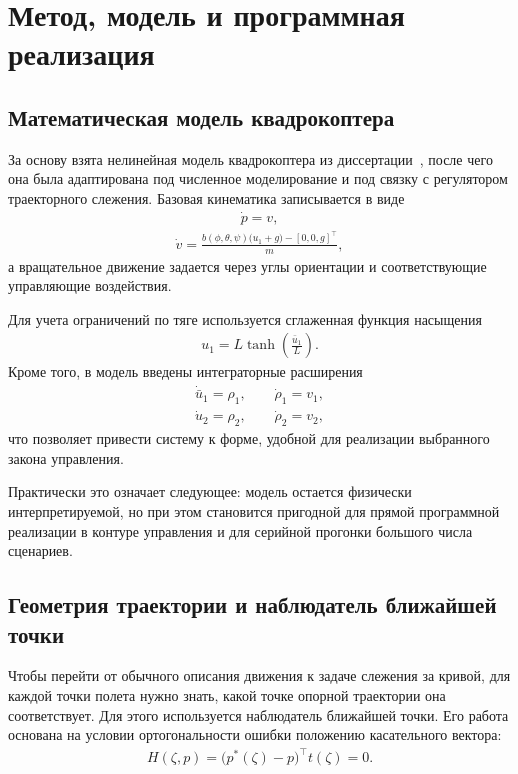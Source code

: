 \chapter{Метод, модель и программная реализация}

\section{Математическая модель квадрокоптера}

За основу взята нелинейная модель квадрокоптера из диссертации~\cite{kim_algorithms}, после чего она была адаптирована под численное моделирование и под связку с регулятором траекторного слежения. Базовая кинематика записывается в виде
\begin{gather}
    \dot{p} = v,
\end{gather}
\begin{gather}
    \dot{v} = \frac{b(\phi,\theta,\psi)\bigl(u_1 + g\bigr) - [0,0,g]^{\top}}{m},
\end{gather}
а вращательное движение задается через углы ориентации и соответствующие управляющие воздействия.

Для учета ограничений по тяге используется сглаженная функция насыщения
\begin{gather}
    u_1 = L \tanh\left(\frac{\bar{u}_1}{L}\right).
\end{gather}
Кроме того, в модель введены интеграторные расширения
\begin{gather}
    \dot{\bar{u}}_1 = \rho_1, \qquad \dot{\rho}_1 = v_1,
\end{gather}
\begin{gather}
    \dot{u}_2 = \rho_2, \qquad \dot{\rho}_2 = v_2,
\end{gather}
что позволяет привести систему к форме, удобной для реализации выбранного закона управления.

Практически это означает следующее: модель остается физически интерпретируемой, но при этом становится пригодной для прямой программной реализации в контуре управления и для серийной прогонки большого числа сценариев.

\section{Геометрия траектории и наблюдатель ближайшей точки}

Чтобы перейти от обычного описания движения к задаче слежения за кривой, для каждой точки полета нужно знать, какой точке опорной траектории она соответствует. Для этого используется наблюдатель ближайшей точки. Его работа основана на условии ортогональности ошибки положению касательного вектора:
\begin{gather}
    H(\zeta,p) = \bigl(p^{\ast}(\zeta) - p\bigr)^{\top} t(\zeta) = 0.
\end{gather}

